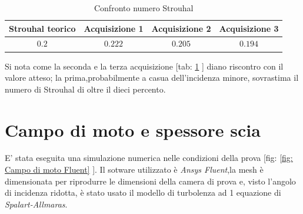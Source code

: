 \begin{table}[h]
\centering
\begin{tabular}{|c|c|c|c|}
\hline
Strouhal teorico & Acquisizione 1 & Acquisizione 2 & Acquisizione 3\\
\hline
$0.2$  & $0.222$   & $0.205 $ & $0.194 $\\
\hline
\end{tabular}
\caption{Confronto numero Strouhal}
\label{tab: Confronto numero Strouhal}
\end{table}

Si nota come la seconda e la terza acquisizione [tab: \ref{tab: Confronto numero Strouhal} ] diano riscontro con il valore atteso; la prima,probabilmente a casua dell'incidenza minore, sovrastima il numero di Strouhal di oltre il dieci percento.

\section{Campo di moto e spessore scia}
E' stata eseguita una simulazione numerica nelle condizioni della prova [fig: \ref{fig: Campo di moto Fluent} ]. Il sotware utilizzato è \emph{Ansys Fluent},la mesh è dimensionata per riprodurre le dimensioni della camera di prova e, visto l'angolo di incidenza ridotta, è stato usato il modello di turbolenza ad 1 equazione di \emph{Spalart-Allmaras}. 


